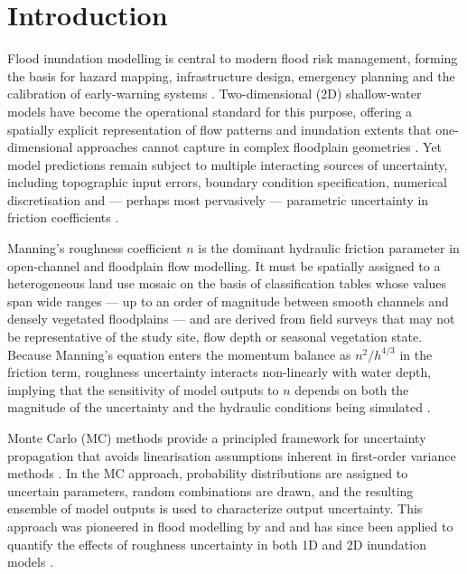 \documentclass[review,12pt]{elsarticle}
\newcommand{\nman}{$n$}
\begin{document}
\section{Introduction}
\label{sec:intro}

Flood inundation modelling is central to modern flood risk management, forming
the basis for hazard mapping, infrastructure design, emergency planning and
the calibration of early-warning systems \citep{teng2017}.
Two-dimensional (2D) shallow-water models have become the operational standard
for this purpose, offering a spatially explicit representation of flow patterns
and inundation extents that one-dimensional approaches cannot capture in
complex floodplain geometries \citep{horritt2002, bates2010}.
Yet model predictions remain subject to multiple interacting sources of
uncertainty, including topographic input errors, boundary condition
specification, numerical discretisation and --- perhaps most pervasively ---
parametric uncertainty in friction coefficients \citep{pappenberger2005,
apel2008, merwade2008}.

Manning's roughness coefficient \nman{} is the dominant hydraulic friction
parameter in open-channel and floodplain flow modelling.
It must be spatially assigned to a heterogeneous land use mosaic on the basis
of classification tables \citep{chow1959, barnes1967, brater1996, fhwa1984}
whose values span wide ranges --- up to an order of magnitude between smooth
channels and densely vegetated floodplains --- and are derived from
field surveys that may not be representative of the study site, flow depth
or seasonal vegetation state.
Because Manning's equation enters the momentum balance as $n^2/h^{4/3}$
in the friction term, roughness uncertainty interacts non-linearly with
water depth, implying that the sensitivity of model outputs to \nman{}
depends on both the magnitude of the uncertainty and the hydraulic conditions
being simulated \citep{hall2005, savage2016}.

Monte Carlo (MC) methods provide a principled framework for uncertainty
propagation that avoids linearisation assumptions inherent in first-order
variance methods \citep{saltelli2010}.
In the MC approach, probability distributions are assigned to uncertain
parameters, random combinations are drawn, and the resulting ensemble of
model outputs is used to characterize output uncertainty.
This approach was pioneered in flood modelling by \citet{aronica2002} and
\citet{pappenberger2005} and has since been applied to quantify the effects
of roughness uncertainty in both 1D and 2D inundation models
\citep{hall2005, mcmillan2010, savage2016, pinos2023, ulate2024}.
\end{document}
